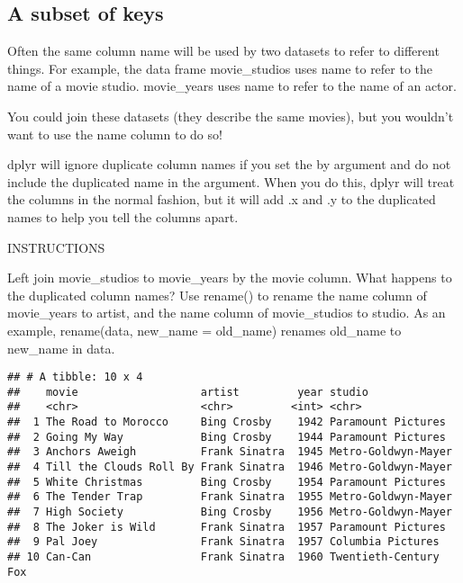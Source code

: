 \documentclass[]{article}
\newenvironment{Shaded}{\begin{snugshade}}{\end{snugshade}}
\newcommand{\KeywordTok}[1]{\textcolor[rgb]{0.13,0.29,0.53}{\textbf{#1}}}
\newcommand{\DataTypeTok}[1]{\textcolor[rgb]{0.13,0.29,0.53}{#1}}
\newcommand{\StringTok}[1]{\textcolor[rgb]{0.31,0.60,0.02}{#1}}
\newcommand{\CommentTok}[1]{\textcolor[rgb]{0.56,0.35,0.01}{\textit{#1}}}
\newcommand{\OperatorTok}[1]{\textcolor[rgb]{0.81,0.36,0.00}{\textbf{#1}}}
\newcommand{\NormalTok}[1]{#1}
\begin{document}
\subsection{A subset of keys}\label{a-subset-of-keys}

Often the same column name will be used by two datasets to refer to
different things. For example, the data frame movie\_studios uses name
to refer to the name of a movie studio. movie\_years uses name to refer
to the name of an actor.

You could join these datasets (they describe the same movies), but you
wouldn't want to use the name column to do so!

dplyr will ignore duplicate column names if you set the by argument and
do not include the duplicated name in the argument. When you do this,
dplyr will treat the columns in the normal fashion, but it will add .x
and .y to the duplicated names to help you tell the columns apart.

INSTRUCTIONS

Left join movie\_studios to movie\_years by the movie column. What
happens to the duplicated column names? Use rename() to rename the name
column of movie\_years to artist, and the name column of movie\_studios
to studio. As an example, rename(data, new\_name = old\_name) renames
old\_name to new\_name in data.

\begin{Shaded}
\end{Shaded}

\begin{verbatim}
## # A tibble: 10 x 4
##    movie                   artist         year studio               
##    <chr>                   <chr>         <int> <chr>                
##  1 The Road to Morocco     Bing Crosby    1942 Paramount Pictures   
##  2 Going My Way            Bing Crosby    1944 Paramount Pictures   
##  3 Anchors Aweigh          Frank Sinatra  1945 Metro-Goldwyn-Mayer  
##  4 Till the Clouds Roll By Frank Sinatra  1946 Metro-Goldwyn-Mayer  
##  5 White Christmas         Bing Crosby    1954 Paramount Pictures   
##  6 The Tender Trap         Frank Sinatra  1955 Metro-Goldwyn-Mayer  
##  7 High Society            Bing Crosby    1956 Metro-Goldwyn-Mayer  
##  8 The Joker is Wild       Frank Sinatra  1957 Paramount Pictures   
##  9 Pal Joey                Frank Sinatra  1957 Columbia Pictures    
## 10 Can-Can                 Frank Sinatra  1960 Twentieth-Century Fox
\end{verbatim}
\end{document}
